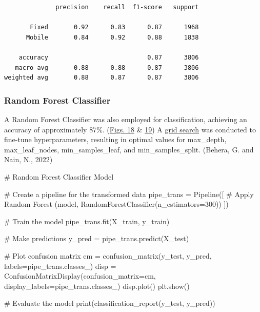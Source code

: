\documentclass[
  letterpaper,
  DIV=11,
  numbers=noendperiod,
  oneside]{scrartcl}
\newenvironment{Shaded}{\begin{snugshade}}{\end{snugshade}}
\newcommand{\BuiltInTok}[1]{\textcolor[rgb]{0.00,0.23,0.31}{#1}}
\newcommand{\CommentTok}[1]{\textcolor[rgb]{0.37,0.37,0.37}{#1}}
\newcommand{\DecValTok}[1]{\textcolor[rgb]{0.68,0.00,0.00}{#1}}
\newcommand{\NormalTok}[1]{\textcolor[rgb]{0.00,0.23,0.31}{#1}}
\newcommand{\OperatorTok}[1]{\textcolor[rgb]{0.37,0.37,0.37}{#1}}
\newcommand{\StringTok}[1]{\textcolor[rgb]{0.13,0.47,0.30}{#1}}
\begin{document}
\begin{verbatim}
              precision    recall  f1-score   support

       Fixed       0.92      0.83      0.87      1968
      Mobile       0.84      0.92      0.88      1838

    accuracy                           0.87      3806
   macro avg       0.88      0.88      0.87      3806
weighted avg       0.88      0.87      0.87      3806
\end{verbatim}

\hypertarget{random-forest-classifier}{%
\subsubsection{Random Forest
Classifier}\label{random-forest-classifier}}

A Random Forest Classifier was also employed for classification,
achieving an accuracy of approximately 87\%.
(\protect\hyperlink{fig-randforest}{Figs. 18} \&
\protect\hyperlink{fig-randforest-betterpars}{19}) A
\protect\hyperlink{lst-gridsearch}{grid search} was conducted to
fine-tune hyperparameters, resulting in optimal values for max\_depth,
max\_leaf\_nodes, min\_samples\_leaf, and min\_samples\_split. (Behera,
G. and Nain, N., 2022)

\begin{Shaded}
\begin{Highlighting}[]
\CommentTok{\# Random Forest Classifier Model}

\CommentTok{\# Create a pipeline for the transformed data}
\NormalTok{pipe\_trans }\OperatorTok{=}\NormalTok{ Pipeline([}
    \CommentTok{\# Apply Random Forest}
\NormalTok{    (}\StringTok{\textquotesingle{}model\textquotesingle{}}\NormalTok{, RandomForestClassifier(n\_estimators}\OperatorTok{=}\DecValTok{300}\NormalTok{))}
\NormalTok{])}

\CommentTok{\# Train the model}
\NormalTok{pipe\_trans.fit(X\_train, y\_train)}

\CommentTok{\# Make predictions}
\NormalTok{y\_pred }\OperatorTok{=}\NormalTok{ pipe\_trans.predict(X\_test)}

\CommentTok{\# Plot confusion matrix}
\NormalTok{cm }\OperatorTok{=}\NormalTok{ confusion\_matrix(y\_test, y\_pred, labels}\OperatorTok{=}\NormalTok{pipe\_trans.classes\_)}
\NormalTok{disp }\OperatorTok{=}\NormalTok{ ConfusionMatrixDisplay(confusion\_matrix}\OperatorTok{=}\NormalTok{cm, display\_labels}\OperatorTok{=}\NormalTok{pipe\_trans.classes\_)}
\NormalTok{disp.plot()}
\NormalTok{plt.show()}

\CommentTok{\# Evaluate the model}
\BuiltInTok{print}\NormalTok{(classification\_report(y\_test, y\_pred))}
\end{Highlighting}
\end{Shaded}
\end{document}
